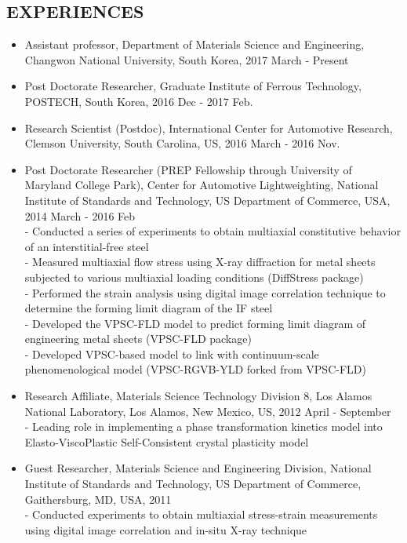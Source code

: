 \documentclass{res}
\begin{document}
\begin{resume}
  \section{EXPERIENCES}
  \begin{itemize}
  \item Assistant professor, Department of Materials Science and Engineering, Changwon National University, South Korea, 2017 March - Present
  \item Post Doctorate Researcher, Graduate Institute of Ferrous Technology, POSTECH, South Korea, 2016 Dec - 2017 Feb.
  \item Research Scientist (Postdoc), International Center for Automotive Research, Clemson University, South Carolina, US, 2016 March - 2016 Nov.
  \item Post Doctorate Researcher (PREP Fellowship through University of Maryland College Park), Center for Automotive Lightweighting,
    National Institute of Standards and Technology, US Department of Commerce, USA, 2014 March - 2016 Feb\\
    - Conducted a series of experiments to obtain multiaxial constitutive behavior of an interstitial-free steel\\
    - Measured multiaxial flow stress using X-ray diffraction for metal sheets subjected to various multiaxial loading conditions (DiffStress package)\\
    - Performed the strain analysis using digital image correlation technique to determine the forming limit diagram of the IF steel\\
    - Developed the VPSC-FLD model to predict forming limit diagram of engineering metal sheets (VPSC-FLD package)\\
    - Developed VPSC-based model to link with continuum-scale phenomenological model (VPSC-RGVB-YLD forked from VPSC-FLD)
  \item Research Affiliate, Materials Science Technology Division 8, Los Alamos National Laboratory, Los Alamos, New Mexico, US, 2012 April - September \\
    - Leading role in implementing a phase transformation kinetics model into Elasto-ViscoPlastic Self-Consistent crystal plasticity model
  \item Guest Researcher, Materials Science and Engineering Division, National Institute of Standards and Technology, US Department of Commerce, Gaithersburg, MD, USA, 2011\\
    - Conducted experiments to obtain multiaxial stress-strain measurements using digital image correlation and in-situ X-ray technique
  \end{itemize}


\end{resume}
\end{document}
